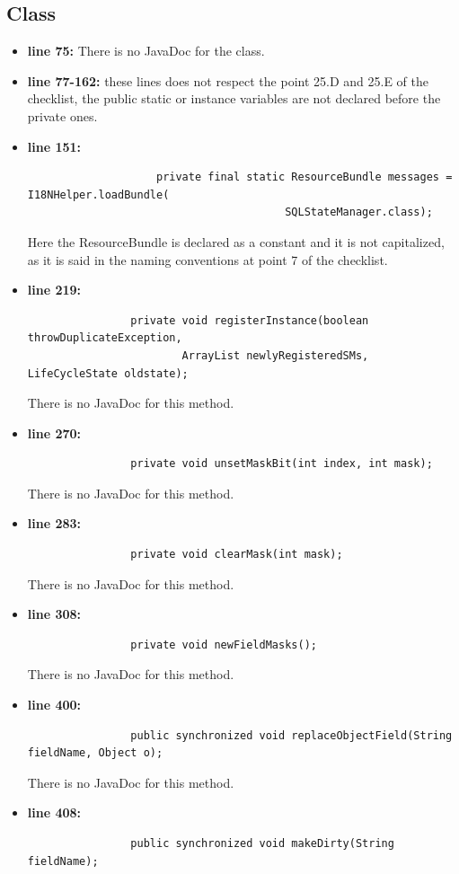 \documentclass[18pt,oneside,a4paper, titlepage]{article}
\begin{document}
		\subsection{Class}
			\begin{itemize}
				\item \textbf{line 75:} There is no JavaDoc for the class.
				\item \textbf{line 77-162:} these lines does not respect the point 25.D and 25.E of the checklist, the public static or instance variables are not declared before the private ones.
				\item \textbf{line 151:} \begin{lstlisting}
					private final static ResourceBundle messages = I18NHelper.loadBundle(
										SQLStateManager.class);
					\end{lstlisting}
				\vspace{0.1cm}
				Here the ResourceBundle is declared as a constant and it is not capitalized, as it is said in the naming conventions at point 7 of the checklist.
				\item \textbf{line 219:} \begin{lstlisting}
				private void registerInstance(boolean throwDuplicateException,
						ArrayList newlyRegisteredSMs, LifeCycleState oldstate);
				\end{lstlisting}
				\vspace{0.1cm}
				There is no JavaDoc for this method.
				\item \textbf{line 270:} 
				\begin{lstlisting}
				private void unsetMaskBit(int index, int mask);
				\end{lstlisting}
				\vspace{0.1cm}
				There is no JavaDoc for this method.
				\item \textbf{line 283:}
				\begin{lstlisting}
				private void clearMask(int mask);
				\end{lstlisting}
				\vspace{0.1cm}
				There is no JavaDoc for this method.
				\item \textbf{line 308:} \begin{lstlisting}
				private void newFieldMasks();
				\end{lstlisting}
				\vspace{0.1cm}
				There is no JavaDoc for this method.
				\item \textbf{line 400:} \begin{lstlisting}
				public synchronized void replaceObjectField(String fieldName, Object o);
				\end{lstlisting}
				\vspace{0.1cm}
				There is no JavaDoc for this method.
				\item \textbf{line 408:} \begin{lstlisting}
				public synchronized void makeDirty(String fieldName);
				\end{lstlisting}
				\vspace{0.1cm}
				

\end{itemize}
\end{document}

